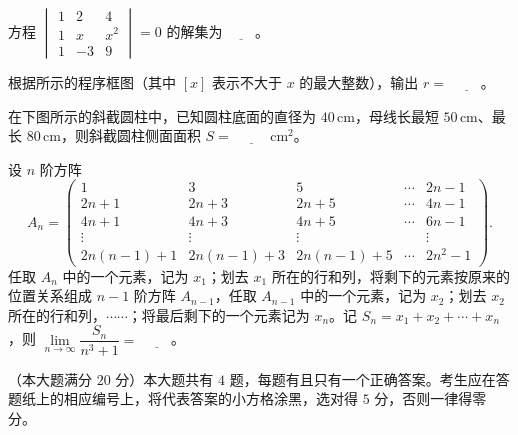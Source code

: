 \begin{question}
方程 $\begin{vmatrix}1&2&4\\1&x&x^2\\1&-3&9\end{vmatrix}=0$ 的解集为 $\underline{\qquad}$。

\Needspace{0.4\textheight}
\end{question}
\begingroup
\renewenvironment{question}{\Needspace{0.4\textheight}}{}
\begin{question}
根据所示的程序框图（其中 $[x]$ 表示不大于 $x$ 的最大整数），输出 $r=$ $\underline{\qquad}$。
\nopagebreak[4]
\begin{center}\end{center}
\nopagebreak[4]
\Needspace{0.4\textheight}
\end{question}
\endgroup
\begingroup
\renewenvironment{question}{\Needspace{0.4\textheight}}{}
\begin{question}
在下图所示的斜截圆柱中，已知圆柱底面的直径为 $40\,\mathrm{cm}$，母线长最短 $50\,\mathrm{cm}$、最长 $80\,\mathrm{cm}$，则斜截圆柱侧面面积 $S=$ $\underline{\qquad}$ $\mathrm{cm}^2$。
\nopagebreak[4]
\begin{center}\end{center}
\nopagebreak[4]
\end{question}
\endgroup
\begin{question}
设 $n$ 阶方阵
\nopagebreak[4]
\[A_n=\begin{pmatrix}
1&3&5&\cdots&2n-1\\
2n+1&2n+3&2n+5&\cdots&4n-1\\
4n+1&4n+3&4n+5&\cdots&6n-1\\
\vdots&\vdots&\vdots&&\vdots\\
2n(n-1)+1&2n(n-1)+3&2n(n-1)+5&\cdots&2n^2-1
\end{pmatrix}.\]
任取 $A_n$ 中的一个元素，记为 $x_1$；划去 $x_1$ 所在的行和列，将剩下的元素按原来的位置关系组成 $n-1$ 阶方阵 $A_{n-1}$，任取 $A_{n-1}$ 中的一个元素，记为 $x_2$；划去 $x_2$ 所在的行和列，$\cdots\cdots$；将最后剩下的一个元素记为 $x_n$。记 $S_n=x_1+x_2+\cdots+x_n$，则 $\lim\limits_{n\to\infty}\dfrac{S_n}{n^3+1}=$ $\underline{\qquad}$。

\end{question}

（本大题满分 $20$ 分）本大题共有 $4$ 题，每题有且只有一个正确答案。考生应在答题纸上的相应编号上，将代表答案的小方格涂黑，选对得 $5$ 分，否则一律得零分。


